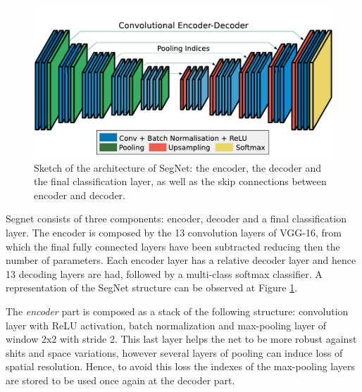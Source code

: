 \documentclass[12pt,a4paper]{article}
\begin{document}
\begin{figure}[!htbp]
\begin{center}
\includegraphics[scale=0.45]{seg_net.png}
\caption{Sketch of the architecture of SegNet: the encoder, the decoder and the final classification layer, as well as the skip connections between encoder and decoder.}
\label{segnet}
\end{center}
\end{figure}

Segnet consists of three components: encoder, decoder and a final classification layer. The encoder is composed by the 13 convolution layers of VGG-16, from which the final fully connected layers have been subtracted reducing then the number of parameters. Each encoder layer has a relative decoder layer and hence 13 decoding layers are had, followed by a multi-class softmax classifier. A representation of the SegNet structure can be observed at Figure \ref{segnet}.\newline

The \textit{encoder} part is composed as a stack of the following structure: convolution layer with ReLU activation, batch normalization and max-pooling layer of window 2x2 with stride 2. This last layer helps the net to be more robust against shits and space variations, however several layers of pooling can induce loss of spatial resolution. Hence, to avoid this loss the indexes of the max-pooling layers are stored to be used once again at the decoder part. \newline
\end{document}
